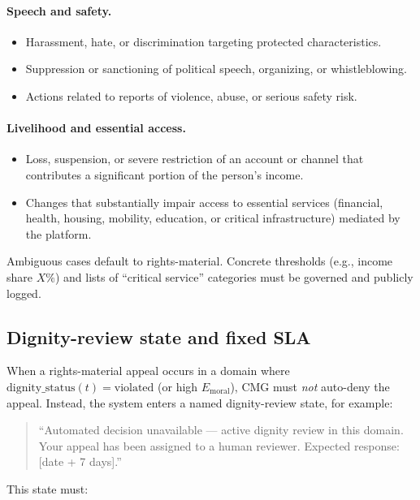 \documentclass[11pt]{article}
\begin{document}
\paragraph{Speech and safety.}
\begin{itemize}[leftmargin=*]
  \item Harassment, hate, or discrimination targeting protected characteristics.
  \item Suppression or sanctioning of political speech, organizing, or whistleblowing.
  \item Actions related to reports of violence, abuse, or serious safety risk.
\end{itemize}

\paragraph{Livelihood and essential access.}
\begin{itemize}[leftmargin=*]
  \item Loss, suspension, or severe restriction of an account or channel that contributes a significant portion of the person’s income.
  \item Changes that substantially impair access to essential services (financial, health, housing, mobility, education, or critical infrastructure) mediated by the platform.
\end{itemize}

Ambiguous cases default to rights-material.
Concrete thresholds (e.g., income share \(X\%\)) and lists of ``critical service'' categories must be governed and publicly logged.

\subsection{Dignity-review state and fixed SLA}

When a rights-material appeal occurs in a domain where \(\text{dignity\_status}(t) = \text{violated}\) (or high \(E_{\text{moral}}\)), CMG must \emph{not} auto-deny the appeal.
Instead, the system enters a named dignity-review state, for example:

\begin{quote}
``Automated decision unavailable --- active dignity review in this domain. Your appeal has been assigned to a human reviewer. Expected response: [date + 7 days].''
\end{quote}

This state must:
\end{document}
